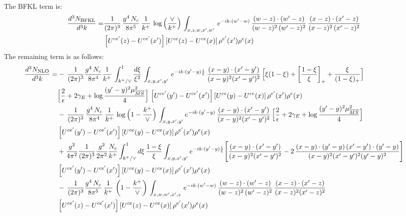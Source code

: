 \documentclass[9pt]{article}
\numberwithin{equation}{section}
\begin{document}
The BFKL term is:
\begin{align}
  \frac{d^{3}N_{\rm BFKL}}{d^{3}k} = &   \frac{1}{(2\pi)^{3}}\, \frac{g^{4}\,N_{c}}{8\pi^{5}}\,\frac{1}{k^{+}}\,\log{\left(\frac{\vee}{k^{+}}\right)}\,\int_{x,z,w,x',w'}\,e^{-ik\cdot (w'-w)}\,\frac{(w-z)\cdot (w'-z)}{(w-z)^{2}\,(w'-z)^{2}}\, \frac{(x-z)\cdot (x'-z)}{(x-z)^{2}\,(x'-z)^{2}}\notag \\ & \left[U^{ce'}(z)-U^{ce'}(x')\right]\left[U^{ce}(z)-U^{ce}(x)\right]\rho^{e'}(x')\rho^{e}(x)
\end{align}
The remaining term is as follows:
\begin{align}
\frac{d^{3}N_{\rm NLO}}{d^{3}k}=&-\,\frac{1}{(2\pi)^{3}}\frac{g^{4}\,N_{c}}{8\pi^{4}}\frac{1}{k^{+}}\,\int_{k^{+}/\vee}^{1}\frac{d\xi}{\xi^{2}}\,\int_{x,y,x',y'}\,e^{-ik\cdot(y'-y)\frac{1}{\xi}}\,\frac{(x-y)\cdot(x'-y')}{(x-y)^{2}(x'-y')^{2}}\,\Big[\xi(1-\xi)+\left[\frac{1-\xi}{\xi}\right]_{+}+\frac{\xi}{(1-\xi)_{+}}\Big]\notag \\ & \Big[\frac{2}{\epsilon}+2\gamma_{E}+\log\frac{(y'-y)^{2}\mu^{2}_{\overline{MS}}}{4}\Big]\,\left[U^{ce'}(y')-U^{ce'}(x')\right]\left[U^{ce}(y)-U^{ce}(x)\right]\rho^{e'}(x')\rho^{e}(x)\notag\\&
-\,\frac{1}{(2\pi)^{3}}\,\frac{g^{4}\,N_{c}}{8\pi^{4}}\,\frac{1}{k^{+}}\,\log\Big(1-\frac{k^{+}}{\vee}\Big)\,\int_{x,y,x',y'}e^{-ik\cdot(y'-y)}\,\frac{(x-y)\cdot(x'-y')}{(x-y)^{2}(x'-y')^{2}}\,\Big[\frac{2}{\epsilon}+2\gamma_{E}+\log\frac{(y'-y)^{2}\mu^{2}_{\overline{MS}}}{4}\Big]\notag \\ & \left[U^{ce'}(y')-U^{ce'}(x')\right]\left[U^{ce}(y)-U^{ce}(x)\right]\rho^{e'}(x')\rho^{e}(x)\notag\\
&+\frac{g^{2}}{4\pi^{2}}\frac{1}{(2\pi)^{3}}\frac{g^{2}}{2\pi^{2}}\frac{N_{c}}{k^{+}}\int_{k^{+}/\vee}^{1}d\xi\,\frac{1-\xi}{\xi}\int_{x,y,x',y'}e^{-ik\cdot(y'-y)\frac{1}{\xi}}\Bigg[\frac{(x-y)\cdot(x'-y')}{(x-y)^{2}(x'-y')^{2}}-2\,\frac{(x-y)\cdot(y'-y)\,(x'-y')\cdot(y'-y)}{(x-y)^{2}(x'-y')^{2}(y'-y)^{2}}\Bigg]\notag \\ & \left[U^{ce'}(y')-U^{ce'}(x')\right]\left[U^{ce}(y)-U^{ce}(x)\right]\rho^{e'}(x')\rho^{e}(x)\notag \\ & -\,\frac{1}{(2\pi)^{3}}\frac{g^{4}\,N_{c}}{8\pi^{5}}\,\frac{1}{k^{+}}\, \left(1-\frac{k^{+}}{\vee}\right)\,\int_{x,w,w',x',z}\,e^{-ik\cdot(w'-w)}\,\frac{(w-z)\cdot (w'-z)}{(w-z)^{2}\, (w'-z)^{2}}\,\frac{(x-z)\cdot(x'-z)}{(x-z)^{2}(x'-z)^{2}}\notag \\ & \left[U^{ce'}(z)-U^{ce'}(x')\right]\left[U^{ce}(z)-U^{ce}(x)\right]\rho^{e'}(x')\rho^{e}(x)
\end{align}
\end{document}
